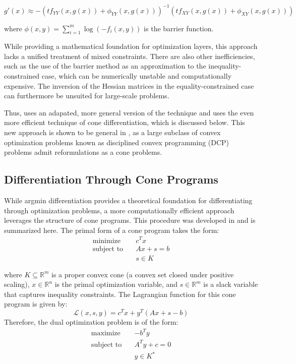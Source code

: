 \documentclass{article}
\begin{document}
\begin{equation}
g'(x) \approx -(tf_{YY}(x,g(x)) + \phi_{YY}(x,g(x)))^{-1}(tf_{XY}(x,g(x)) + \phi_{XY}(x,g(x)))
\end{equation}

where $\phi(x,y) = \sum_{i=1}^m \log(-f_i(x,y))$ is the barrier function.

While providing a mathematical foundation for optimization layers, this approach lacks a unified treatment of mixed constraints. There are also other inefficiencies, such as the use of the barrier method as an approximation to the inequality-constrained case, which can be numerically unstable and computationally expensive. The inversion of the Hessian matrices in the equality-constrained case can furthermore be unsuited for large-scale problems. 


Thus, \citet{optnet} uses an adapated, more general version of the technique and \citet{differentiableconvexoptimizationlayers} uses the even more efficient technique of cone differentiation, which is discussed below. This new approach is shown to be general in \citet{differentiableconvexoptimizationlayers}, as a large subclass of convex optimization problems known as disciplined convex programming (DCP) problems admit reformulations as a cone problems. 

\subsection{Differentiation Through Cone Programs}

While argmin differentiation provides a theoretical foundation for differentiating through optimization problems, a more computationally efficient approach leverages the structure of cone programs. This procedure was developed in \citet{conedifferentiation} and is summarized here. The primal form of a cone program takes the form:
\begin{equation}
\begin{aligned}
\text{minimize} \quad & c^T x \\
\text{subject to} \quad & Ax + s = b \\
                        & s \in K
\end{aligned}
\end{equation}

where $K \subseteq \mathbb{R}^m$ is a proper convex cone (a convex set closed under positive scaling), $x \in \mathbb{R}^n$ is the primal optimization variable, and $s \in \mathbb{R}^m$ is a slack variable that captures inequality constraints. The Lagrangian function for this cone program is given by:
\begin{equation}
\mathcal{L}(x,s,y) = c^T x + y^T(Ax + s - b)
\end{equation}
Therefore, the dual optimization problem is of the form:
\begin{equation}
\begin{aligned}
\text{maximize} \quad & -b^T y \\
\text{subject to} \quad & A^T y + c = 0 \\
                        & y \in K^*
\end{aligned}
\end{equation}
\end{document}

